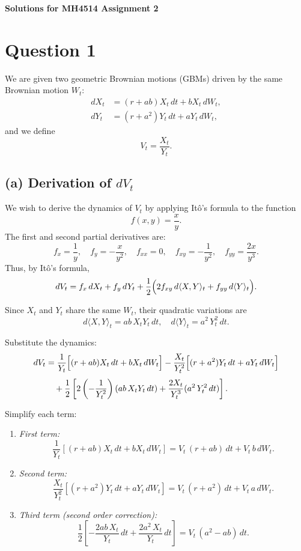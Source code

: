 \documentclass[12pt]{article}
\begin{document}
\begin{center}
    \textbf{\large Solutions for MH4514 Assignment 2}
\end{center}
\bigskip

\section*{Question 1}

We are given two geometric Brownian motions (GBMs) driven by the same Brownian motion \(W_t\):
\begin{align*}
    dX_t &= (r+ab)X_t\,dt + bX_t\,dW_t,\\[1mm]
    dY_t &= \left(r+a^2\right)Y_t\,dt + aY_t\,dW_t,
\end{align*}
and we define
\[
V_t = \frac{X_t}{Y_t}.
\]

\subsection*{(a) Derivation of \(dV_t\)}

We wish to derive the dynamics of \(V_t\) by applying It\^o's formula to the function
\[
f(x,y) = \frac{x}{y}.
\]
The first and second partial derivatives are:
\[
f_x = \frac{1}{y},\quad f_y = -\frac{x}{y^2},\quad f_{xx} = 0,\quad f_{xy} = -\frac{1}{y^2},\quad f_{yy} = \frac{2x}{y^3}.
\]
Thus, by It\^o's formula,
\[
dV_t = f_x\,dX_t + f_y\,dY_t + \frac{1}{2}\Bigl(2f_{xy}\,d\langle X,Y\rangle_t + f_{yy}\,d\langle Y\rangle_t\Bigr).
\]

Since \(X_t\) and \(Y_t\) share the same \(W_t\), their quadratic variations are
\[
d\langle X,Y\rangle_t = ab\,X_tY_t\,dt,\quad d\langle Y\rangle_t = a^2\,Y_t^2\,dt.
\]

Substitute the dynamics:
\begin{align*}
dV_t &= \frac{1}{Y_t}\Bigl[(r+ab)X_t\,dt + bX_t\,dW_t\Bigr] - \frac{X_t}{Y_t^2}\Bigl[(r+a^2)Y_t\,dt + aY_t\,dW_t\Bigr] \\[1mm]
&\quad + \frac{1}{2}\left[ 2\left(-\frac{1}{Y_t^2}\right)(ab\,X_tY_t\,dt) + \frac{2X_t}{Y_t^3}(a^2\,Y_t^2\,dt)\right].
\end{align*}

Simplify each term:
\begin{enumerate}[label=\textbf{Step \arabic*:}, wide]
    \item \emph{First term:}
    \[
    \frac{1}{Y_t}\left[(r+ab)X_t\,dt + bX_t\,dW_t\right] = V_t\,(r+ab)\,dt + V_t\,b\,dW_t.
    \]
    \item \emph{Second term:}
    \[
    \frac{X_t}{Y_t^2}\left[(r+a^2)Y_t\,dt + aY_t\,dW_t\right] = V_t\,(r+a^2)\,dt + V_t\,a\,dW_t.
    \]
    \item \emph{Third term (second order correction):}
    \[
    \frac{1}{2}\left[-\frac{2ab\,X_t}{Y_t}\,dt + \frac{2a^2\,X_t}{Y_t}\,dt\right]
    = V_t\,(a^2-ab)\,dt.
    \]
\end{enumerate}
\end{document}
